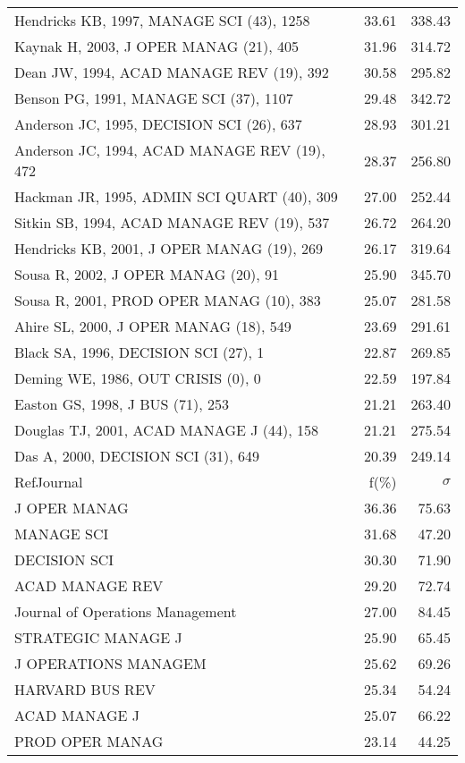 \documentclass[a4paper,11pt]{report}
\begin{document}
\begin{landscape}
\begin{table}[!ht]
{\begin{tabular}{|l r r|}
Hendricks KB, 1997, MANAGE SCI (43), 1258 & 33.61 & 338.43\\
Kaynak H, 2003, J OPER MANAG (21), 405 & 31.96 & 314.72\\
Dean JW, 1994, ACAD MANAGE REV (19), 392 & 30.58 & 295.82\\
Benson PG, 1991, MANAGE SCI (37), 1107 & 29.48 & 342.72\\
Anderson JC, 1995, DECISION SCI (26), 637 & 28.93 & 301.21\\
Anderson JC, 1994, ACAD MANAGE REV (19), 472 & 28.37 & 256.80\\
Hackman JR, 1995, ADMIN SCI QUART (40), 309 & 27.00 & 252.44\\
Sitkin SB, 1994, ACAD MANAGE REV (19), 537 & 26.72 & 264.20\\
Hendricks KB, 2001, J OPER MANAG (19), 269 & 26.17 & 319.64\\
Sousa R, 2002, J OPER MANAG (20), 91 & 25.90 & 345.70\\
Sousa R, 2001, PROD OPER MANAG (10), 383 & 25.07 & 281.58\\
Ahire SL, 2000, J OPER MANAG (18), 549 & 23.69 & 291.61\\
Black SA, 1996, DECISION SCI (27), 1 & 22.87 & 269.85\\
Deming WE, 1986, OUT CRISIS (0), 0 & 22.59 & 197.84\\
Easton GS, 1998, J BUS (71), 253 & 21.21 & 263.40\\
Douglas TJ, 2001, ACAD MANAGE J (44), 158 & 21.21 & 275.54\\
Das A, 2000, DECISION SCI (31), 649 & 20.39 & 249.14\\
\hline
\hline
RefJournal & f(\%) & $\sigma$\\
\hline
J OPER MANAG & 36.36 & 75.63\\
MANAGE SCI & 31.68 & 47.20\\
DECISION SCI & 30.30 & 71.90\\
ACAD MANAGE REV & 29.20 & 72.74\\
Journal of Operations Management & 27.00 & 84.45\\
STRATEGIC MANAGE J & 25.90 & 65.45\\
J OPERATIONS MANAGEM & 25.62 & 69.26\\
HARVARD BUS REV & 25.34 & 54.24\\
ACAD MANAGE J & 25.07 & 66.22\\
PROD OPER MANAG & 23.14 & 44.25\\
\hline
\end{tabular}
}
\end{table}


\end{landscape}
\end{document}
